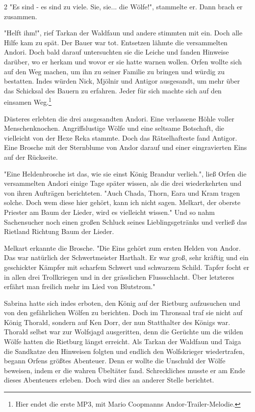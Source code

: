 \documentclass[10pt, a4paper, oneside]{book}
\begin{document}
\begin{multicols}{2}
"Es sind - es sind zu viele. Sie, sie... die Wölfe!", stammelte er. Dann brach er zusammen.

"Helft ihm!", rief Tarkan der Waldfaun und andere stimmten mit ein. Doch alle Hilfe kam zu spät. Der Bauer war tot. Entsetzen lähmte die versammelten Andori. Doch bald darauf untersuchten sie die Leiche und fanden Hinweise darüber, wo er herkam und wovor er sie hatte warnen wollen. Orfen wollte sich auf den Weg machen, um ihn zu seiner Familie zu bringen und würdig zu bestatten. Indes würden Nick, Mjölnir und Antigor ausgesandt, um mehr über das Schicksal des Bauern zu erfahren. Jeder für sich machte sich auf den einsamen Weg.\footnote{Hier endet die erste MP3, mit Mario Coopmanns Andor-Trailer-Melodie.}\bigskip

Düsteres erlebten die drei ausgesandten Andori. Eine verlassene Höhle voller Menschenknochen. Angriffslustige Wölfe und eine seltsame Botschaft, die vielleicht von der Hexe Reka stammte. Doch das Rätselhafteste fand Antigor. Eine Brosche mit der Sternblume von Andor darauf und einer eingravierten Eins auf der Rückseite.

"Eine Heldenbrosche ist das, wie sie einst König Brandur verlieh.", ließ Orfen die versammelten Andori einige Tage später wissen, als die drei wiederkehrten und von ihren Aufträgen berichteten. "Auch Chada, Thorn, Eara und Kram tragen solche. Doch wem diese hier gehört, kann ich nicht sagen. Melkart, der oberste Priester am Baum der Lieder, wird es vielleicht wissen." Und so nahm Sachensucher noch einen großen Schluck seines Lieblingsgetränks und verließ das Rietland Richtung Baum der Lieder.

Melkart erkannte die Brosche. "Die Eins gehört zum ersten Helden von Andor. Das war natürlich der Schwertmeister Harthalt. Er war groß, sehr kräftig und ein geschickter Kämpfer mit scharfem Schwert und schwarzem Schild. Tapfer focht er in allen drei Trollkriegen und in der grässlichen Flussschlacht. Über letzteres erfährt man freilich mehr im Lied von Blutstrom."

Sabrina hatte sich indes erboten, den König auf der Rietburg aufzusuchen und von den gefährlichen Wölfen zu berichten. Doch im Thronsaal traf sie nicht auf König Thorald, sondern auf Ken Dorr, der nun Statthalter des Königs war. Thorald selbst war zur Wolfsjagd ausgeritten, denn die Gerüchte um die wilden Wölfe hatten die Rietburg längst erreicht. Als Tarkan der Waldfaun und Taiga die Sandkatze den Hinweisen folgten und endlich den Wolfskrieger wiedertrafen, begann Orfens größtes Abenteuer. Denn er wollte die Unschuld der Wölfe beweisen, indem er die wahren Übeltäter fand. Schreckliches musste er am Ende dieses Abenteuers erleben. Doch wird dies an anderer Stelle berichtet.


\end{multicols}
\end{document}
